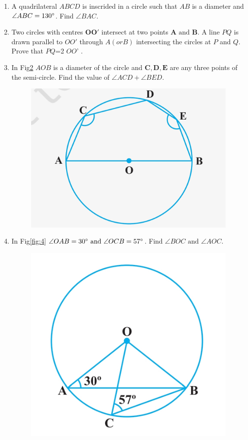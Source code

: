 \documentclass[12pt]{article}
\let\vec\mathbf
\begin{document}
\begin{enumerate}
\begin{figure}[h!]
\caption{}
\label{fig:2}
\end{figure}
\item A quadrilateral ${ABCD}$ is inscrided in a circle such that $AB$ is a diameter and $\angle{ABC} = 130\degree$. Find $\angle{BAC}$.
\item Two circles with centres $\vec{O}$$\vec{O}\prime$ intersect at two points $\vec{A}\text{ and }\vec{B}$. A line $PQ$ is drawn parallel to $OO\prime$ through $A(or B)$ intersecting the circles at $P$ and $Q$. Prove that $PQ$=2  $OO$' .
\item In Fig\ref{fig:3} $AOB$ is a diameter of the circle and $\vec{C},\vec{D},\vec{E}$ are any three points of the semi-circle. Find the value of $\angle ACD + \angle BED$.
\begin{figure}[h!]
   \includegraphics[width=\columnwidth]{figs/image3.jpg}
\caption{}
\label{fig:3}
\end{figure}
\item In Fig\ref{fig:4} $\angle OAB = 30\degree\text{ and }\angle OCB = 57\degree$. Find $\angle BOC\text{ and }\angle AOC$.
\begin{figure}[h!]
   \includegraphics[width=\columnwidth]{figs/image4.jpg}

\end{figure}
\end{enumerate}
\end{document}
